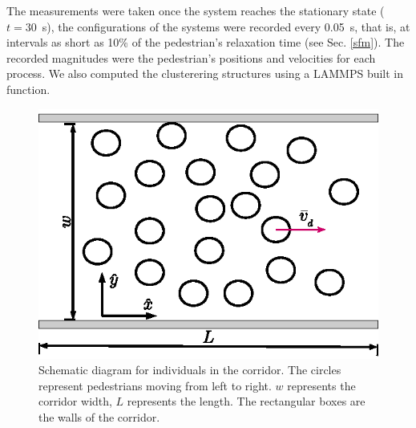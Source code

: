 The measurements were taken once the system reaches the stationary state ($t=30$~s), the configurations of the systems were recorded every 0.05~s, that is, at intervals as short as 10\% of the pedestrian’s relaxation time (see Sec. \ref{sfm}). The recorded magnitudes were the pedestrian’s positions and velocities for each process. We also computed the clusterering structures using a LAMMPS built in function.  



\begin{figure}[htbp!]
\includegraphics[width=\columnwidth]
{./plots/corridor.eps}
\caption{\label{pasillo} Schematic diagram for individuals in the corridor. 
The circles represent pedestrians moving from left to right. $w$ represents the corridor width, $L$ represents the length. The rectangular boxes are the walls of the corridor.  }
\end{figure}
